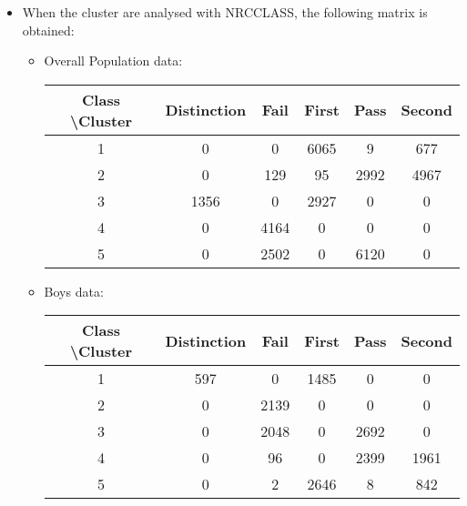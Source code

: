 \begin{itemize}
\begin{itemize}
		\item
		When the cluster are analysed with NRC\textunderscore CLASS, the following matrix is obtained:
		
		\begin{itemize}
			\item
			Overall Population data: 
			\begin{center}
		    \begin{tabular}{ | c | c | c | c | c | c |}
		    \hline
			   	 Class \textbackslash Cluster & 	Distinction  & Fail  & First & Pass  & Second \\ 	\hline
				  1      &     0  &  0   & 6065 &  9   &  677  \\ 	\hline		
				  2      &     0  & 129  &   95 & 2992 &  4967 \\ 	\hline		
				  3      &  1356  &  0   & 2927 &  0   &  0 	  \\ 	\hline		
				  4      &    0   & 4164 &  0   &   0  &  0    \\ 	\hline		
				  5      &     0  & 2502 &   0  & 6120 &  0    \\ 	\hline		
				\end{tabular}
			\end{center}
			
			\item
			Boys data: 
			\begin{center}
		    \begin{tabular}{ | c | c | c | c | c | c |}
		    \hline
			   	 Class \textbackslash Cluster & 	Distinction  & Fail  & First & Pass  & Second \\ 	\hline				     
						  1     &    597 &   0  & 1485 &   0  &    0  \\ 	\hline
						  2     &      0 & 2139 &    0 &   0  &    0  \\ 	\hline
						  3     &      0 & 2048 &    0 & 2692 &    0  \\ 	\hline
						  4     &      0 &  96  &   0  & 2399 &  1961 \\ 	\hline
						  5     &      0 &   2  & 2646 &   8  &  842	 \\ 	\hline	
				\end{tabular}
			\end{center}
						

\end{itemize}
\end{itemize}
\end{itemize}
